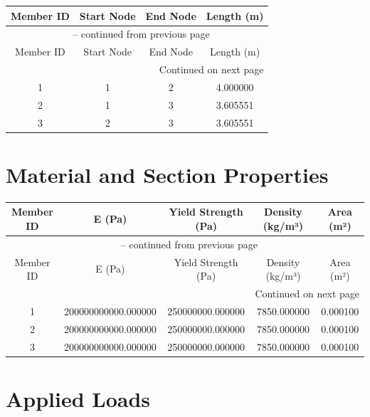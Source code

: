 \documentclass[11pt,a4paper]{article}
\begin{document}
\begin{longtable}{cccc}
\toprule
Member ID & Start Node & End Node & Length (m) \\
\midrule
\endfirsthead

\multicolumn{4}{c}{{\tablename\ \thetable{} -- continued from previous page}} \\
\toprule
Member ID & Start Node & End Node & Length (m) \\
\midrule
\endhead

\midrule
\multicolumn{4}{r}{{Continued on next page}} \\
\endfoot

\bottomrule
\endlastfoot

1 & 1 & 2 & 4.000000 \\
2 & 1 & 3 & 3.605551 \\
3 & 2 & 3 & 3.605551 \\
\end{longtable}

\section{Material and Section Properties}

\begin{longtable}{ccccc}
\toprule
Member ID & E (Pa) & Yield Strength (Pa) & Density (kg/m³) & Area (m²) \\
\midrule
\endfirsthead

\multicolumn{5}{c}{{\tablename\ \thetable{} -- continued from previous page}} \\
\toprule
Member ID & E (Pa) & Yield Strength (Pa) & Density (kg/m³) & Area (m²) \\
\midrule
\endhead

\midrule
\multicolumn{5}{r}{{Continued on next page}} \\
\endfoot

\bottomrule
\endlastfoot

1 & 200000000000.000000 & 250000000.000000 & 7850.000000 & 0.000100 \\
2 & 200000000000.000000 & 250000000.000000 & 7850.000000 & 0.000100 \\
3 & 200000000000.000000 & 250000000.000000 & 7850.000000 & 0.000100 \\
\end{longtable}

\section{Applied Loads}
\end{document}
